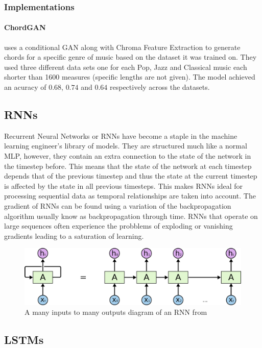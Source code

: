 \subsubsection{Implementations}

\paragraph{ChordGAN} \cite{ChordGAN} uses a conditional GAN along with Chroma Feature Extraction to generate chords for a specific genre of music based on the dataset it was trained on.
They used three different data sets one for each Pop, Jazz and Classical music each shorter than 1600 measures (specific lengths are not given).
The model achieved an acuracy of $0.68$, $0.74$ and $0.64$ respectively across the datasets.

\subsection{RNNs}

Recurrent Neural Networks or RNNs have become a staple in the machine learning engineer's library of models. 
They are structured much like a normal MLP, however, they contain an extra connection to the state of the network in the timestep before.
This means that the state of the network at each timestep depends that of the previous timestep and thus the state at the current timestep is affected by the state in all previous timesteps.
This makes RNNs ideal for processing sequential data as temporal relationships are taken into account.
The gradient of RNNs can be found using a variation of the backpropagation algorithm usually know as backpropagation through time.
RNNs that operate on large sequences often experience the probblems of exploding or vanishing gradients leading to a saturation of learning.

\begin{figure}
    \centering
    \includegraphics[width=0.8\columnwidth]{Figures/RNN}
    \decoRule
    \caption[An RNN]{A many inputs to many outputs diagram of an RNN from \cite{oinkina}}
    \label{fig:RNN}
\end{figure}

\subsection{LSTMs}

